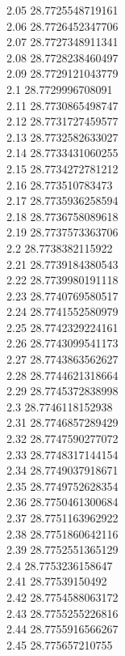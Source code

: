 {2.05	28.7725548719161\\
2.06	28.7726452347706\\
2.07	28.7727348911341\\
2.08	28.7728238460497\\
2.09	28.7729121043779\\
2.1	28.7729996708091\\
2.11	28.7730865498747\\
2.12	28.7731727459577\\
2.13	28.7732582633027\\
2.14	28.7733431060255\\
2.15	28.7734272781212\\
2.16	28.773510783473\\
2.17	28.7735936258594\\
2.18	28.7736758089618\\
2.19	28.7737573363706\\
2.2	28.7738382115922\\
2.21	28.7739184380543\\
2.22	28.7739980191118\\
2.23	28.7740769580517\\
2.24	28.7741552580979\\
2.25	28.7742329224161\\
2.26	28.7743099541173\\
2.27	28.7743863562627\\
2.28	28.7744621318664\\
2.29	28.7745372838998\\
2.3	28.7746118152938\\
2.31	28.7746857289429\\
2.32	28.7747590277072\\
2.33	28.7748317144154\\
2.34	28.7749037918671\\
2.35	28.7749752628354\\
2.36	28.7750461300684\\
2.37	28.7751163962922\\
2.38	28.7751860642116\\
2.39	28.7752551365129\\
2.4	28.7753236158647\\
2.41	28.77539150492\\
2.42	28.7754588063172\\
2.43	28.7755255226816\\
2.44	28.7755916566267\\
2.45	28.775657210755\\
}
